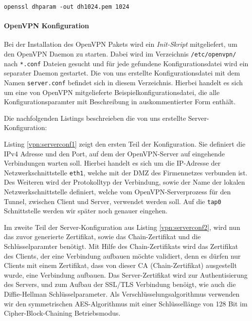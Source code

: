 \begin{lstlisting}
openssl dhparam -out dh1024.pem 1024
\end{lstlisting}


\paragraph{OpenVPN Konfiguration} Bei der Installation des OpenVPN Pakets wird ein \emph{Init-Skript} mitgeliefert, um den OpenVPN Daemon zu starten. Dabei wird im Verzeichnis \texttt{/etc/openvpn/} nach \texttt{*.conf} Dateien gesucht und für jede gefundene Konfigurationsdatei wird ein separater Daemon gestartet. Die von uns erstellte Konfigurationsdatei mit dem Namen \texttt{server.conf} befindet sich in diesem Verzeichnis. Hierbei handelt es sich um eine von OpenVPN mitgelieferte Beispielkonfigurationsdatei, die alle Konfigurationsparamter mit Beschreibung in auskommentierter Form enthält.

Die nachfolgenden Listings beschreieben die von uns erstellte Server-Konfiguration:



Listing \ref{vpn:serverconf1} zeigt den ersten Teil der Konfiguration. Sie definiert die IPv4 Adresse und den Port, auf dem der OpenVPN-Server auf eingehende Verbindungen warten soll. Hierbei handelt es sich um die IP-Adresse der Netzwerkschnittstelle \texttt{eth1}, welche mit der DMZ des Firmennetzes verbunden ist. Des Weiteren wird der Protokolltyp der Verbindung, sowie der Name der lokalen Netzwerkschnittstelle definiert, welche vom OpenVPN-Serverprozess für den Tunnel, zwischen Client und Server, verwendet werden soll. Auf die \texttt{tap0} Schnittstelle werden wir später noch genauer eingehen.



Im zweite Teil der Server-Konfiguration aus Listing \ref{vpn:serverconf2}, wird nun das zuvor generierte Zertifikat, sowie das Chain-Zertifikat und die Schlüsselparamter benötigt. Mit Hilfe des Chain-Zertifikats wird das Zertifikat des Clients, der eine Verbindung aufbauen möchte validiert, denn es dürfen nur Clients mit einem Zertifikat, dass von dieser CA (Chain-Zertifikat) ausgestellt wurde, eine Verbindung aufbauen. Das Server-Zertifikat wird zur Authentisierung des Servers, und zum Aufbau der SSL/TLS Verbindung benöigt, wie auch die Diffie-Hellman Schlüsselparameter. Als Verschlüsselungsalgorithmus verwenden wir den symmetrischen AES-Algorithmus mit einer Schlüssellänge von 128 Bit im Cipher-Block-Chaining Betriebsmodus.

